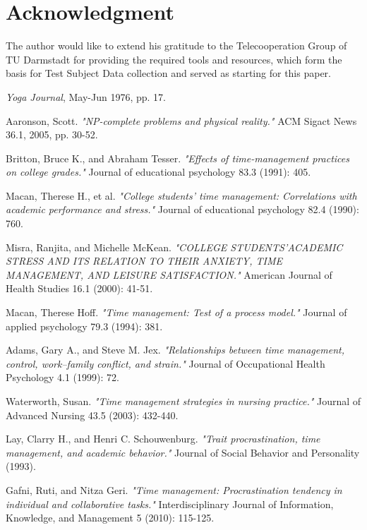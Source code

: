 \documentclass[conference]{IEEEtran}
\begin{document}
\section*{Acknowledgment}
The author would like to extend his gratitude to the Telecooperation Group of TU Darmstadt for providing the required tools and resources, which form the basis for Test Subject Data collection and served as starting for this paper.





\begin{thebibliography}{1}

\emph{Yoga Journal}, \relax May-Jun 1976, pp. 17.

Aaronson, Scott. \emph{"NP-complete problems and physical reality."} ACM Sigact News 36.1, 2005, pp. 30-52.

Britton, Bruce K., and Abraham Tesser. \emph{"Effects of time-management practices on college grades."} Journal of educational psychology 83.3 (1991): 405.

Macan, Therese H., et al. \emph{"College students' time management: Correlations with academic performance and stress."} Journal of educational psychology 82.4 (1990): 760.

Misra, Ranjita, and Michelle McKean. \emph{"COLLEGE STUDENTS'ACADEMIC STRESS AND ITS RELATION TO THEIR ANXIETY, TIME MANAGEMENT, AND LEISURE SATISFACTION."} American Journal of Health Studies 16.1 (2000): 41-51.

Macan, Therese Hoff. \emph{"Time management: Test of a process model."} Journal of applied psychology 79.3 (1994): 381.

Adams, Gary A., and Steve M. Jex. \emph{"Relationships between time management, control, work–family conflict, and strain."} Journal of Occupational Health Psychology 4.1 (1999): 72.

Waterworth, Susan. \emph{"Time management strategies in nursing practice."} Journal of Advanced Nursing 43.5 (2003): 432-440.

Lay, Clarry H., and Henri C. Schouwenburg. \emph{"Trait procrastination, time management, and academic behavior."} Journal of Social Behavior and Personality (1993).

Gafni, Ruti, and Nitza Geri. \emph{"Time management: Procrastination tendency in individual and collaborative tasks."} Interdisciplinary Journal of Information, Knowledge, and Management 5 (2010): 115-125.



\end{thebibliography}




\end{document}
